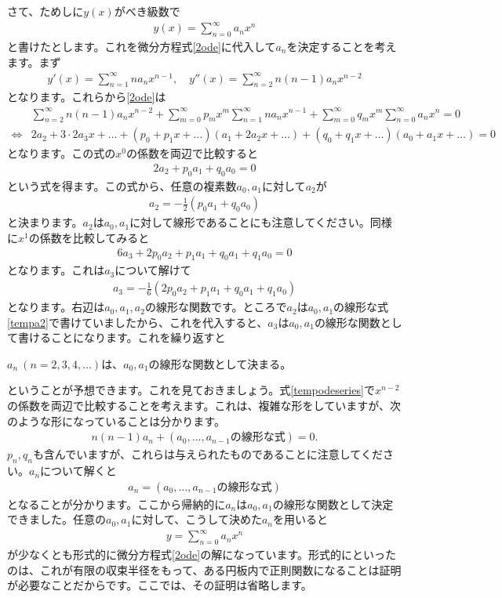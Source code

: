 \documentclass[report,paper=a4, fontsize=12pt, line_length=16cm, number_of_lines=33,dvipdfmx]{jlreq}
\newenvironment{myquote}{\begin{tcolorbox}[
  colback = blue!5, after = \noindent] }{\end{tcolorbox}}
\numberwithin{equation}{section}
\begin{document}
さて、ためしに$y(x)$がべき級数で
\begin{align}
  y(x)=\sum_{n=0}^{\infty}a_n x^n
\end{align}
と書けたとします。これを微分方程式\eqref{2ode}に代入して$a_n$を決定することを考えます。まず
\begin{align}
  y'(x)=\sum_{n=1}^{\infty} n a_n x^{n-1},\quad
  y''(x)=\sum_{n=2}^{\infty} n(n-1)a_n x^{n-2}
\end{align}
となります。これらから\eqref{2ode}は
\begin{align}
  &\sum_{n=2}^{\infty} n(n-1)a_n x^{n-2}+
  \sum_{m=0}^{\infty}p_{m}x^m\sum_{n=1}^{\infty} n a_n x^{n-1}
  +\sum_{m=0}^{\infty}q_{m}x^m\sum_{n=0}^{\infty}a_n x^n=0\label{tempodeseries}\\
\Leftrightarrow&
2a_2+3\cdot 2 a_3 x+\dots
+(p_0+p_1x+\dots)(a_1+2a_2x+\dots)
+(q_0+q_1x+\dots)(a_0+a_1x+\dots)=0
\end{align}
となります。この式の$x^0$の係数を両辺で比較すると
\begin{align}
  2a_2+p_0a_1+q_0a_0=0
\end{align}
という式を得ます。この式から、任意の複素数$a_0,a_1$に対して$a_2$が
\begin{align}
  a_2=-\frac12(p_0a_1+q_0a_0)\label{tempa2}
\end{align}
と決まります。$a_2$は$a_0,a_1$に対して線形であることにも注意してください。同様に$x^1$の係数を比較してみると
\begin{align}
  6a_3+2p_0a_2+p_1a_1+q_0a_1+q_1a_0=0
\end{align}
となります。これは$a_3$について解けて
\begin{align}
  a_3=-\frac16(2p_0a_2+p_1a_1+q_0a_1+q_1a_0)
\end{align}
となります。右辺は$a_0,a_1,a_2$の線形な関数です。ところで$a_2$は$a_0,a_1$の線形な式\eqref{tempa2}で書けていましたから、これを代入すると、$a_3$は$a_0,a_1$の線形な関数として書けることになります。これを繰り返すと
\begin{myquote}
  $a_n\ (n=2,3,4,\dots)$は、$a_0,a_1$の線形な関数として決まる。
\end{myquote}
ということが予想できます。これを見ておきましょう。式\eqref{tempodeseries}で$x^{n-2}$の係数を両辺で比較することを考えます。これは、複雑な形をしていますが、次のような形になっていることは分かります。
\begin{align}
  n(n-1)a_n+(a_0,\dots,a_{n-1}\text{の線形な式})=0.
\end{align}
$p_n,q_n$も含んでいますが、これらは与えられたものであることに注意してください。$a_n$について解くと
\begin{align}
  a_n=(a_0,\dots,a_{n-1}\text{の線形な式})
\end{align}
となることが分かります。ここから帰納的に$a_n$は$a_0,a_1$の線形な関数として決定できました。任意の$a_0,a_1$に対して、こうして決めた$a_n$を用いると
\begin{align}
  y=\sum_{n=0}^{\infty}a_nx^n
\end{align}
が少なくとも形式的に微分方程式\eqref{2ode}の解になっています。形式的にといったのは、これが有限の収束半径をもって、ある円板内で正則関数になることは証明が必要なことだからです。ここでは、その証明は省略します。
\end{document}
